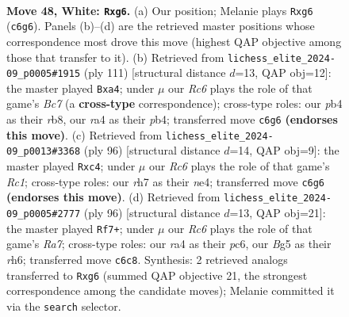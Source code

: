 \documentclass[11pt]{article}
\begin{document}
\clearpage

\begin{figure}[p]\centering
\begin{subfigure}{0.46\textwidth}\centering
\resizebox{\linewidth}{!}{%
\newchessgame
\chessboard[
  setfen={4k3/7r/1pR3p1/6B1/rp1P4/3K4/8/8 w - - 1 48},
  showmover=false,
  pgfstyle=straightmove, color=movearrow, markmove={c6-g6}
]}
\caption{}
\end{subfigure}\hfill
\begin{subfigure}{0.46\textwidth}\centering
\resizebox{\linewidth}{!}{%
\newchessgame
\chessboard[
  setfen={1R6/2pk4/8/8/PPP5/5r2/2b5/4K3 b - - 0 56},
  showmover=false,
  pgfstyle=straightmove, color=movearrow, markmove={c2-a4}
]}
\caption{}
\end{subfigure}
\\[4pt]
\begin{subfigure}{0.46\textwidth}\centering
\resizebox{\linewidth}{!}{%
\newchessgame
\chessboard[
  setfen={8/7p/4k2P/1r6/2pBn3/1p6/4K3/2R5 w - - 0 49},
  showmover=false,
  pgfstyle=straightmove, color=movearrow, markmove={c1-c4}
]}
\caption{}
\end{subfigure}\hfill
\begin{subfigure}{0.46\textwidth}\centering
\resizebox{\linewidth}{!}{%
\newchessgame
\chessboard[
  setfen={8/R7/p1p4r/8/2P1p3/2K5/5k2/8 w - - 8 49},
  showmover=false,
  pgfstyle=straightmove, color=movearrow, markmove={a7-f7}
]}
\caption{}
\end{subfigure}
\caption{\textbf{Move 48, White: \texttt{Rxg6}.} (a) Our position; Melanie plays \texttt{Rxg6} (\texttt{c6g6}). Panels (b)--(d) are the retrieved master positions whose correspondence most drove this move (highest QAP objective among those that transfer to it). (b) Retrieved from \texttt{lichess\_elite\_2024-09\_p0005\#1915} (ply 111) [structural distance $d$=13, QAP obj=12]: the master played \texttt{Bxa4}; under $\mu$ our \emph{Rc6} plays the role of that game's \emph{Bc7} (a \textbf{cross-type} correspondence); cross-type roles: our \emph{p}b4 as their \emph{r}b8, our \emph{r}a4 as their \emph{p}b4; transferred move \texttt{c6g6} \textbf{(endorses this move)}. (c) Retrieved from \texttt{lichess\_elite\_2024-09\_p0013\#3368} (ply 96) [structural distance $d$=14, QAP obj=9]: the master played \texttt{Rxc4}; under $\mu$ our \emph{Rc6} plays the role of that game's \emph{Rc1}; cross-type roles: our \emph{r}h7 as their \emph{n}e4; transferred move \texttt{c6g6} \textbf{(endorses this move)}. (d) Retrieved from \texttt{lichess\_elite\_2024-09\_p0005\#2777} (ply 96) [structural distance $d$=13, QAP obj=21]: the master played \texttt{Rf7+}; under $\mu$ our \emph{Rc6} plays the role of that game's \emph{Ra7}; cross-type roles: our \emph{r}a4 as their \emph{p}c6, our \emph{B}g5 as their \emph{r}h6; transferred move \texttt{c6c8}. Synthesis: 2 retrieved analogs transferred to \texttt{Rxg6} (summed QAP objective 21, the strongest correspondence among the candidate moves); Melanie committed it via the \texttt{search} selector.}
\label{fig:thought-m94}
\end{figure}
\end{document}
